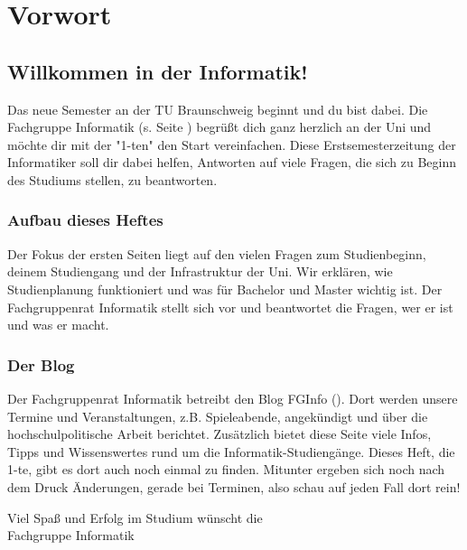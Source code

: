 
\section{Vorwort}
\label{vorwort}
	\begin{multicols}{2}
	\subsection*{Willkommen in der Informatik!}	

	Das neue Semester an der TU Braunschweig beginnt und du bist dabei. Die Fachgruppe Informatik (s. Seite \pageref{fachgruppe}) begrüßt dich ganz herzlich an der Uni und möchte dir mit der "1-ten" den Start vereinfachen. Diese Erstsemesterzeitung der Informatiker soll dir dabei helfen, Antworten auf viele Fragen, die sich zu Beginn des Studiums stellen, zu beantworten.

	\subsubsection*{Aufbau dieses Heftes}
		Der Fokus der ersten Seiten liegt auf den vielen Fragen zum Studienbeginn, deinem Studiengang und der Infrastruktur der Uni. Wir erklären, wie Studienplanung funktioniert und was für Bachelor und Master wichtig ist.
Der Fachgruppenrat Informatik stellt sich vor und beantwortet die Fragen, wer er ist und was er macht. 
\columnbreak
	\subsubsection*{Der Blog}
		Der Fachgruppenrat Informatik betreibt den Blog FGInfo (\fginfoUrl). Dort werden unsere Termine und Veranstaltungen, z.B. Spieleabende, angekündigt und über die hochschulpolitische Arbeit berichtet.
Zusätzlich bietet diese Seite viele Infos, Tipps und Wissenswertes rund um die Informatik-Studiengänge.
Dieses Heft, die 1-te, gibt es dort auch noch einmal zu finden. Mitunter
ergeben sich noch nach dem Druck Änderungen, gerade bei Terminen, also schau auf jeden Fall dort rein!

	\vspace*{0.5cm}

	Viel Spaß und Erfolg im  Studium wünscht  die\\
	\hspace*{2cm}Fachgruppe Informatik
	\end{multicols}
	\vspace{0.5cm}
